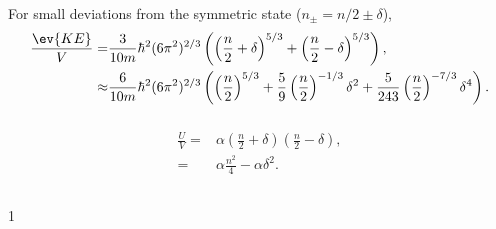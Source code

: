 \documentclass[a4paper,12pt,twoside]{article}
\newcommand{\mcols}{0}
\begin{document}
\begin{multicols*}{2}
\subsubsection{}
For small deviations from the symmetric state ($n_\pm = n/2 \pm \delta$),
\begin{align}
	\frac{\ev{KE}}{V} =& \frac{3}{10m} \hbar^2 (6\pi^2)^{2/3} \left(\left(\frac{n}{2}+\delta\right)^{5/3}+\left( \frac{n}{2}-\delta \right)^{5/3}\right),\\
	\approx& \frac{6}{10m} \hbar^2 (6\pi^2)^{2/3} \left( \left(\frac{n}{2}\right)^{5/3} + \frac{5}{9} \left(\frac{n}{2}\right)^{-1/3}\delta^2 + \frac{5}{243}\left(\frac{n}{2}\right)^{-7/3}\delta^4 \right).
\end{align}
\subsubsection{}
\begin{align}
	\frac{U}{V} =& \alpha \left(\frac{n}{2}+\delta\right) \left(\frac{n}{2}-\delta\right),\\
	=& \alpha \frac{n^2}{4} - \alpha \delta^2.
\end{align}
\subsubsection{}
\subsection{}
\subsubsection{}
\subsubsection{}
\subsubsection{}
\subsubsection{}
\subsection{}

\printBib


\if\mcols1
\end{multicols*}
\fi
\end{document}
